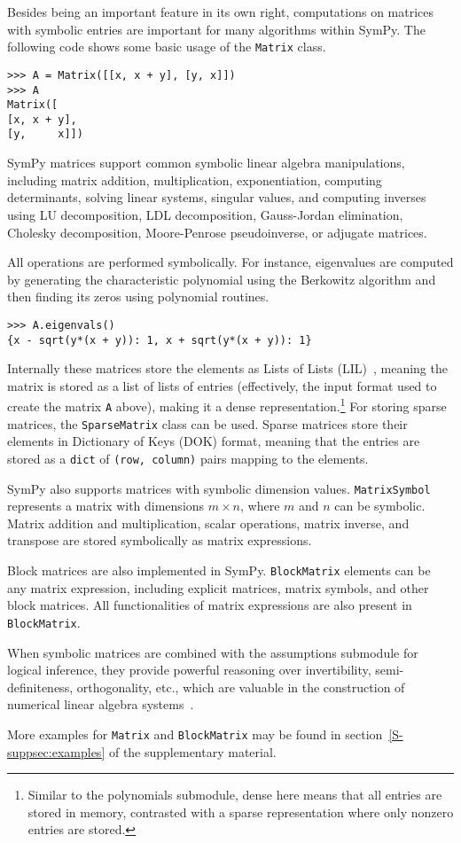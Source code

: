 Besides being an important feature in its own right, computations on
matrices with symbolic entries are important for many algorithms
within SymPy.  The following code shows some basic usage of the
\texttt{Matrix} class.
\begin{verbatim}
>>> A = Matrix([[x, x + y], [y, x]])
>>> A
Matrix([
[x, x + y],
[y,     x]])
\end{verbatim}

SymPy matrices support common symbolic linear algebra manipulations, including
matrix addition, multiplication, exponentiation, computing determinants,
solving linear systems, singular values, and computing inverses using LU
decomposition, LDL decomposition, Gauss-Jordan elimination, Cholesky
decomposition, Moore-Penrose pseudoinverse, or adjugate matrices.

All operations are performed symbolically. For instance, eigenvalues are computed
by generating the characteristic polynomial using the Berkowitz algorithm and
then finding its zeros using polynomial routines.

\begin{verbatim}
>>> A.eigenvals()
{x - sqrt(y*(x + y)): 1, x + sqrt(y*(x + y)): 1}
\end{verbatim}

Internally these matrices store the elements as Lists of Lists (LIL)~\cite{scipy}, meaning
the matrix is stored as a list of lists of entries (effectively, the
input format used to create the matrix \texttt{A} above), making it a
dense representation.\footnote{Similar to the polynomials submodule, dense here
  means that all entries are stored in memory, contrasted with a sparse
  representation where only nonzero entries are stored.} For storing sparse
matrices, the \verb|SparseMatrix| class can be used. Sparse matrices store
their elements in Dictionary of Keys (DOK) format, meaning that the entries are stored
as a \texttt{dict} of \texttt{(row, column)} pairs mapping to the elements.

SymPy also supports matrices with symbolic dimension values. \verb|MatrixSymbol|
represents a matrix with dimensions $m\times n$, where $m$ and $n$ can be
symbolic. Matrix addition and multiplication, scalar operations, matrix inverse,
and transpose are stored symbolically as matrix expressions.

Block matrices are also implemented in SymPy. \verb|BlockMatrix| elements can
be any matrix expression, including explicit matrices, matrix symbols, and
other block matrices. All functionalities of matrix expressions are also
present in \verb|BlockMatrix|.

When symbolic matrices are combined with the assumptions submodule for logical
inference, they provide powerful reasoning over invertibility,
semi-definiteness, orthogonality, etc., which are valuable in the construction
of numerical linear algebra systems~\cite{rocklin2013mathematically}.

More examples for \verb|Matrix| and \verb|BlockMatrix| may be found in
section~\ref{S-suppsec:examples} of the supplementary material.
